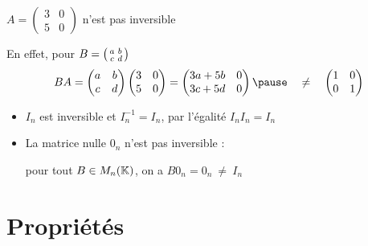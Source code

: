
\begin{frame}
\begin{exemple}
$ A = \left(\begin{smallmatrix}
3 & 0\\
5 & 0\end{smallmatrix}\right)$
n'est pas inversible

\pause
En effet, pour 
$B= \left( \begin{smallmatrix}
a & b \cr
c & d\cr
\end{smallmatrix} \right)$ 
$$
BA = 
\begin{pmatrix}
a & b \cr
c & d\cr
\end{pmatrix}
\begin{pmatrix}
3 & 0\\
5 & 0   
\end{pmatrix}
=
\begin{pmatrix}
3a+5b & 0\\
3c+5d      & 0
\end{pmatrix} \pause \quad \neq \quad
\begin{pmatrix}
1 & 0 \cr
0 & 1\cr
\end{pmatrix}$$
\end{exemple}

\pause
\begin{exemple}
\begin{itemize}
  \item $I_{n}$ est inversible et $I_n^{-1}=I_n$, par l'égalité 
 $I_{n}I_{n}=I_{n}$
 
  \item\pause La matrice nulle $0_n$ n'est pas inversible : 
  
  pour tout $B\in M_{n}(\mathbb{K})$, on a $B0_n=0_n \ \neq \ I_n$
\end{itemize}
  \end{exemple}

\end{frame}


\section{Propriétés}

